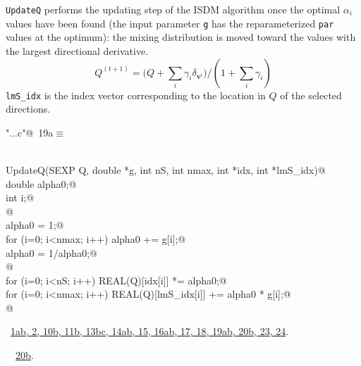 \documentclass[reqno]{amsart}
\renewcommand{\NWtarget}[2]{\hypertarget{#1}{#2}}
\renewcommand{\NWlink}[2]{\hyperlink{#1}{#2}}
\newcommand{\bv}{\mathbf{v}}
\providecommand{\tsum}{\textstyle\sum}
\begin{document}
\texttt{UpdateQ} performs the updating step of the ISDM algorithm once the optimal
$\alpha_i$ values have been found (the input parameter \texttt{g} has the reparameterized 
\texttt{par} values at the optimum): the mixing
distribution is moved toward the values with the largest directional derivative.
\begin{equation}
Q^{(t+1)} =  \big(Q + \tsum_i\gamma_i\delta_{\bv^i}\big)/(1+\tsum_i\gamma_i)
\end{equation}
\texttt{lmS\_idx} is the index vector corresponding to the location in $Q$ of the 
selected directions.

\begin{flushleft} \small
\begin{minipage}{\linewidth}\label{scrap30}\raggedright\small
\NWtarget{nuweb19a}{} \verb@"..\src\ReprodCalcs.c"@\nobreak\ {\footnotesize {19a}}$\equiv$
\vspace{-1ex}
\begin{list}{}{} \item
\mbox{}\verb@@\\
\mbox{}\verb@void UpdateQ(SEXP Q, double *g, int nS, int nmax, int *idx, int *lmS_idx){@\\
\mbox{}\verb@   double alpha0;@\\
\mbox{}\verb@   int i;@\\
\mbox{}\verb@   @\\
\mbox{}\verb@   alpha0 = 1;@\\
\mbox{}\verb@   for (i=0; i<nmax; i++) alpha0 += g[i];@\\
\mbox{}\verb@   alpha0 = 1/alpha0;@\\
\mbox{}\verb@   @\\
\mbox{}\verb@   for (i=0; i<nS; i++) REAL(Q)[idx[i]] *= alpha0;@\\
\mbox{}\verb@   for (i=0; i<nmax; i++) REAL(Q)[lmS_idx[i]] += alpha0 * g[i];@\\
\mbox{}\verb@}@\\
\mbox{}\verb@@{\NWsep}
\end{list}
\vspace{-1.5ex}
\footnotesize
\begin{list}{}{\setlength{\itemsep}{-\parsep}\setlength{\itemindent}{-\leftmargin}}
\item \NWtxtFileDefBy\ \NWlink{nuweb1a}{1a}\NWlink{nuweb1b}{b}\NWlink{nuweb2}{, 2}\NWlink{nuweb10b}{, 10b}\NWlink{nuweb11b}{, 11b}\NWlink{nuweb13b}{, 13b}\NWlink{nuweb13c}{c}\NWlink{nuweb14a}{, 14a}\NWlink{nuweb14b}{b}\NWlink{nuweb15}{, 15}\NWlink{nuweb16a}{, 16a}\NWlink{nuweb16b}{b}\NWlink{nuweb17}{, 17}\NWlink{nuweb18}{, 18}\NWlink{nuweb19a}{, 19a}\NWlink{nuweb19b}{b}\NWlink{nuweb20b}{, 20b}\NWlink{nuweb23}{, 23}\NWlink{nuweb24}{, 24}.
\item \NWtxtIdentsDefed\nobreak\  \verb@UpdateQ@\nobreak\ \NWlink{nuweb20b}{20b}.
\item{}
\end{list}
\end{minipage}\vspace{4ex}
\end{flushleft}
\end{document}
